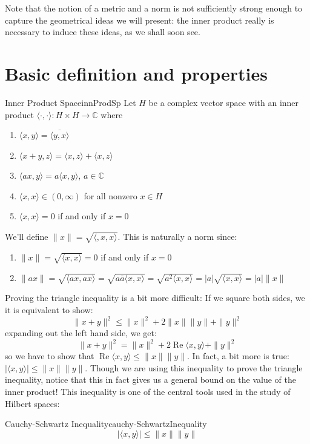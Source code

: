\documentclass[oneside]{book}
\newcommand{\C}{\mathbb{C}}
\newcommand{\oln}{\overline}
\renewcommand{\Re}{\operatorname{Re}}
\newcommand{\rw}{\rightarrow}
\begin{document}
Note that the notion of a metric and a norm is not sufficiently strong enough to capture the geometrical ideas we will
present: the inner product really is necessary to induce these ideas, as we shall soon see.

\section{Basic definition and properties}

\begin{defn}{Inner Product Space}{innProdSp}
Let $H$ be a complex vector space with an inner product $\langle \cdot, \cdot\rangle: H\times H \rw \C$ where
\begin{enumerate}
	\item $\langle x,y\rangle = \oln{\langle y,x\rangle}$
	\item $\langle x+y,z\rangle = \langle x,z\rangle + \langle x,z\rangle$
	\item $\langle ax, y\rangle = a\langle x,y\rangle$, $a \in \C$
	\item $\langle x,x\rangle \in (0, \infty)$ for all nonzero $x \in H$
	\item $\langle x,x\rangle = 0$ if and only if $x = 0$
\end{enumerate}
\end{defn}

We'll define $\|x\| = \sqrt{\langle, x,x\rangle}$. This is naturally a norm since:
\begin{enumerate}
\item $\|x\| = \sqrt{\langle x,x\rangle} = 0$ if and only if $x = 0$
\item $\|ax\| = \sqrt{\langle ax,ax\rangle} = \sqrt{a\oln{a}\langle x,x\rangle}= \sqrt{a^2\langle x,x\rangle}
	= |a|\sqrt{\langle x,x\rangle} = |a|\|x\|$
\end{enumerate}
Proving the triangle inequality is a bit more difficult: If we square both sides, we it is equivalent to show:
\[
\|x +y\|^2 \le \|x\|^2 + 2\|x\|\|y\| + \|y\|^2
\]
expanding out the left hand side, we get:
\[
\|x +y\|^2 = \|x\|^2 + 2\Re\langle x,y\rangle + \|y\|^2
\]
so we have to show that $\Re\langle x,y\rangle \le \|x\|\|y\|$. In fact, a bit more is true: $|\langle x,y\rangle| \le
\|x\|\|y\|$. Though we are using this inequality to prove the triangle inequality, notice that this in fact gives us
a general bound on the value of the inner product! This inequality is one of the central tools used in the study of
Hilbert spaces:

\begin{thm}{Cauchy-Schwartz Inequality}{cauchy-SchwartzInequality}
\[
	|\langle x,y\rangle| \le \|x\|\|y\|
\]
\end{thm}
\end{document}
